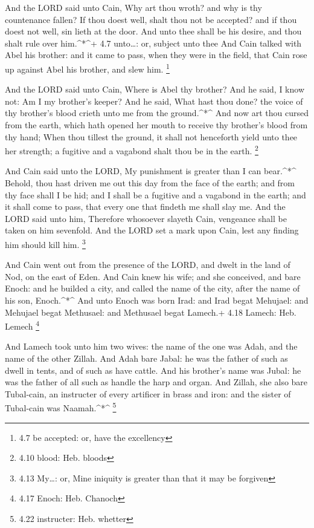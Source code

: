  And the LORD said unto Cain, Why art thou wroth? and why is
thy countenance fallen?  If thou doest well, shalt thou not
be accepted? and if thou doest not well, sin lieth at the door. And unto
thee shall be his desire, and thou shalt rule over him.\^{}*\^{}+ 4.7
unto\ldots: or, subject unto thee  And Cain talked with Abel
his brother: and it came to pass, when they were in the field, that Cain
rose up against Abel his brother, and slew him. \footnote{4.7 be
  accepted: or, have the excellency}

 And the LORD said unto Cain, Where is Abel thy brother? And
he said, I know not: Am I my brother's keeper?  And he
said, What hast thou done? the voice of thy brother's blood crieth unto
me from the ground.\^{}*\^{}  And now art thou cursed from
the earth, which hath opened her mouth to receive thy brother's blood
from thy hand;  When thou tillest the ground, it shall not
henceforth yield unto thee her strength; a fugitive and a vagabond shalt
thou be in the earth. \footnote{4.10 blood: Heb. bloods}

 And Cain said unto the LORD, My punishment is greater than
I can bear.\^{}*\^{}  Behold, thou hast driven me out this
day from the face of the earth; and from thy face shall I be hid; and I
shall be a fugitive and a vagabond in the earth; and it shall come to
pass, that every one that findeth me shall slay me.  And
the LORD said unto him, Therefore whosoever slayeth Cain, vengeance
shall be taken on him sevenfold. And the LORD set a mark upon Cain, lest
any finding him should kill him. \footnote{4.13 My\ldots: or, Mine
  iniquity is greater than that it may be forgiven}

 And Cain went out from the presence of the LORD, and dwelt
in the land of Nod, on the east of Eden.  And Cain knew his
wife; and she conceived, and bare Enoch: and he builded a city, and
called the name of the city, after the name of his son, Enoch.\^{}*\^{}
 And unto Enoch was born Irad: and Irad begat Mehujael: and
Mehujael begat Methusael: and Methusael begat Lamech.+ 4.18 Lamech: Heb.
Lemech \footnote{4.17 Enoch: Heb. Chanoch}

 And Lamech took unto him two wives: the name of the one
was Adah, and the name of the other Zillah.  And Adah bare
Jabal: he was the father of such as dwell in tents, and of such as have
cattle.  And his brother's name was Jubal: he was the
father of all such as handle the harp and organ.  And
Zillah, she also bare Tubal-cain, an instructer of every artificer in
brass and iron: and the sister of Tubal-cain was Naamah.\^{}*\^{}
\footnote{4.22 instructer: Heb. whetter}

